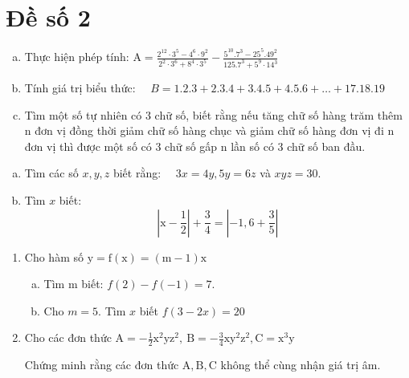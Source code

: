 \onehalfspacing
\section{Đề số 2}

\begin{bt} 
    \hfill
    \begin{enumerate}[a.]
        \item Thực hiện phép tính: $\mathrm{A}=\frac{2^{12} \cdot 3^5-4^6 \cdot 9^2}{2^2 \cdot 3^6+8^4 \cdot 3^5}-\frac{5^{10} .7^3-25^5 .49^2}{125.7^3+5^9 \cdot 14^3}$
        \item Tính giá trị biểu thức: $\quad B=1.2 .3+2.3 .4+3.4 .5+4.5 .6+\ldots+17.18 .19$
        \item Tìm một số tự nhiên có 3 chữ số, biết rằng nếu tăng chữ số hàng trăm thêm $\mathrm{n}$ đơn vị đồng thời giảm chữ số hàng chục và giảm chữ số hàng đơn vị đi n đơn vị thì được một số có 3 chữ số gấp n lần số có 3 chữ số ban đầu.
    \end{enumerate}
\loigiai{} 
\end{bt}

\begin{bt}
    \hfill
    \begin{enumerate}[a.]
        \item Tìm các số $x, y, z$ biết rằng: $\quad 3 x=4 y, 5 y=6 z$ và $x y z=30$.
        \item Tìm $x$ biết:
    $$
    \left|\mathrm{x}-\frac{1}{2}\right|+\frac{3}{4}=\left|-1,6+\frac{3}{5}\right|
    $$
    \end{enumerate}
\loigiai{} 
\end{bt}

\begin{bt}
    \hfill
    \begin{enumerate}[1.]
        \item Cho hàm số $\mathrm{y}=\mathrm{f}(\mathrm{x})=(\mathrm{m}-1) \mathrm{x}$
           \begin{enumerate}[a.]
            \item Tìm m biết: $f(2)-f(-1)=7$.
            \item Cho $m=5$. Tìm $x$ biết $f(3-2 x)=20$
           \end{enumerate}
        \item Cho các đơn thức $\mathrm{A}=-\frac{1}{2} \mathrm{x}^2 \mathrm{yz}^2, \mathrm{~B}=-\frac{3}{4} \mathrm{xy}^2 \mathrm{z}^2, \mathrm{C}=\mathrm{x}^3 \mathrm{y}$
        
        Chứng minh rằng các đơn thức $\mathrm{A}, \mathrm{B}, \mathrm{C}$ không thể cùng nhận giá trị âm.
    \end{enumerate}
\loigiai{} 
\end{bt}

